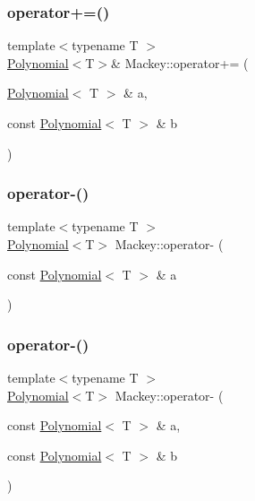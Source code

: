 \subsubsection{\texorpdfstring{operator+=()}{operator+=()}}
{\footnotesize\ttfamily template$<$typename T $>$ \\
\hyperlink{classMackey_1_1Polynomial}{Polynomial}$<$T$>$\& Mackey\+::operator+= (\begin{DoxyParamCaption}\item[{\hyperlink{classMackey_1_1Polynomial}{Polynomial}$<$ T $>$ \&}]{a,  }\item[{const \hyperlink{classMackey_1_1Polynomial}{Polynomial}$<$ T $>$ \&}]{b }\end{DoxyParamCaption})}

\mbox{\label{namespaceMackey_a76e1e4a6dac913bc86971d8515475fa5}} 
\subsubsection{\texorpdfstring{operator-\/()}{operator-()}\hspace{0.1cm}{\footnotesize\ttfamily [1/4]}}
{\footnotesize\ttfamily template$<$typename T $>$ \\
\hyperlink{classMackey_1_1Polynomial}{Polynomial}$<$T$>$ Mackey\+::operator-\/ (\begin{DoxyParamCaption}\item[{const \hyperlink{classMackey_1_1Polynomial}{Polynomial}$<$ T $>$ \&}]{a }\end{DoxyParamCaption})}

\mbox{\label{namespaceMackey_a803f57e25754b9ca58e4757a46f9b23a}} 
\subsubsection{\texorpdfstring{operator-\/()}{operator-()}\hspace{0.1cm}{\footnotesize\ttfamily [2/4]}}
{\footnotesize\ttfamily template$<$typename T $>$ \\
\hyperlink{classMackey_1_1Polynomial}{Polynomial}$<$T$>$ Mackey\+::operator-\/ (\begin{DoxyParamCaption}\item[{const \hyperlink{classMackey_1_1Polynomial}{Polynomial}$<$ T $>$ \&}]{a,  }\item[{const \hyperlink{classMackey_1_1Polynomial}{Polynomial}$<$ T $>$ \&}]{b }\end{DoxyParamCaption})}

